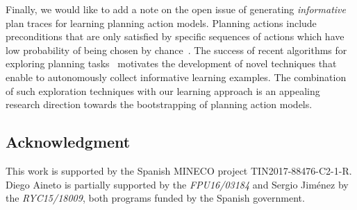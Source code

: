 \documentclass[3p,times]{elsarticle}
\newcommand{\strips}{\textsc{Strips}}     %
\newcommand{\ARMS}{{\small {\sffamily ARMS}}\xspace}
\newcommand{\FAMA}{{\small {\sffamily FAMA}}\xspace}
\begin{document}
Finally, we would like to add a note on the open issue of generating {\em informative} plan traces for learning planning action models. Planning actions include preconditions that are only satisfied by specific sequences of actions which have low probability of being chosen by chance~\cite{fern2004learning}. The success of recent algorithms for exploring planning tasks~\cite{FrancesRLG17} motivates the development of novel techniques that enable to autonomously collect informative learning examples. The combination of such exploration techniques with our learning approach is an appealing research direction towards the bootstrapping of planning action models.













\subsection*{Acknowledgment}
This work is supported by the Spanish MINECO project TIN2017-88476-C2-1-R. Diego Aineto is partially supported by the {\it FPU16/03184} and Sergio Jim\'enez by the {\it RYC15/18009}, both programs funded by the Spanish government.
\end{document}

